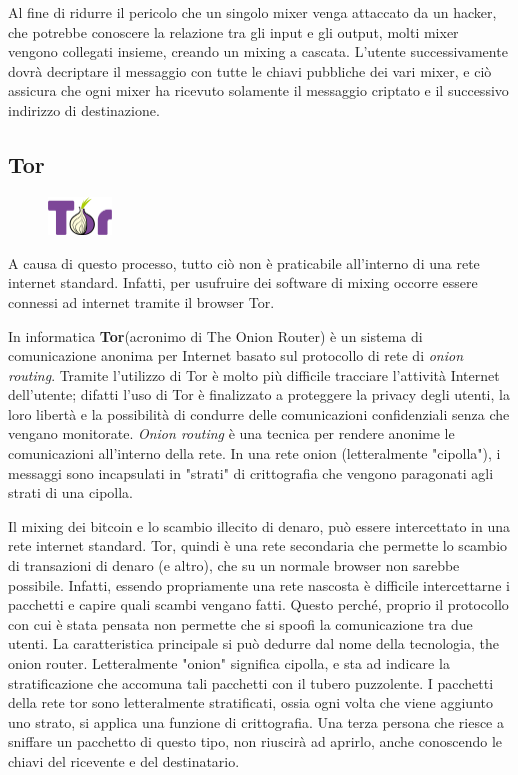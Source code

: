 Al fine di ridurre il pericolo che un singolo mixer venga attaccato da un hacker, che potrebbe conoscere la relazione tra gli input e gli output, molti mixer vengono collegati insieme, creando un mixing a cascata. L'utente successivamente dovrà decriptare il messaggio con tutte le chiavi pubbliche dei vari mixer, e ciò assicura che ogni mixer ha ricevuto solamente il messaggio criptato e il successivo indirizzo di destinazione.\cite{moser2013anonymity}

\subsection{Tor}

\begin{figure}
	\vspace{-20pt}
	\includegraphics[width=0.15\textwidth]{figure/torlogo}
\end{figure}
A causa di questo processo, tutto ciò non è praticabile all'interno di una rete internet standard. Infatti, per usufruire dei software di mixing occorre essere connessi ad internet tramite il browser Tor.

In informatica \textbf{Tor}(acronimo di The Onion Router) è un sistema di comunicazione anonima per Internet basato sul protocollo di rete di \textit{onion routing}. Tramite l'utilizzo di Tor è molto più difficile tracciare l'attività Internet dell'utente; difatti l'uso di Tor è finalizzato a proteggere la privacy degli utenti, la loro libertà e la possibilità di condurre delle comunicazioni confidenziali senza che vengano monitorate. \textit{Onion routing} è una tecnica per rendere anonime le comunicazioni all'interno della rete. In una rete onion (letteralmente "cipolla"), i messaggi sono incapsulati in "strati" di crittografia che vengono paragonati agli strati di una cipolla. \cite{wiki:tor}

Il mixing dei bitcoin e lo scambio illecito di denaro, può essere intercettato in una rete internet standard. Tor, quindi è una rete secondaria che permette lo scambio di transazioni di denaro (e altro), che su un normale browser non sarebbe possibile. Infatti, essendo propriamente una rete nascosta è difficile intercettarne i pacchetti e capire quali scambi vengano fatti. Questo perché, proprio il protocollo con cui è stata pensata non permette che si spoofi la comunicazione tra due utenti. La caratteristica principale si può dedurre dal nome della tecnologia, the onion router. Letteralmente "onion" significa cipolla, e sta ad indicare la stratificazione che accomuna tali pacchetti con il tubero puzzolente. 
I pacchetti della rete tor sono letteralmente stratificati, ossia ogni volta che viene aggiunto uno strato, si applica una funzione di crittografia. Una terza persona che riesce a sniffare un pacchetto di questo tipo, non riuscirà ad aprirlo, anche conoscendo le chiavi del ricevente e del destinatario.

